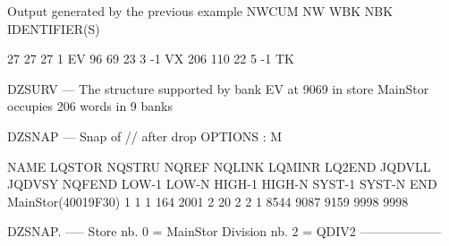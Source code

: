 \begin{landscapebody}
\begin{XMPt}{Output generated by the previous example}
  NWCUM     NW   WBK  NBK    IDENTIFIER(S)                                                                                       
                                                                                                                                 
     27     27    27    1     EV                                                                                                 
     96     69    23    3       -1 VX                                                                                            
    206    110    22    5            -1 TK                                                                                       
                                                                                                                                 
DZSURV --- The structure supported by bank EV   at       9069 in store MainStor occupies        206 words in      9 banks        
                                                                                                                                 
DZSNAP --- Snap of // after drop                                                                   OPTIONS : M                   
                                                                                                                                 
  NAME       LQSTOR NQSTRU  NQREF NQLINK LQMINR LQ2END JQDVLL JQDVSY NQFEND  LOW-1  LOW-N HIGH-1 HIGH-N SYST-1 SYST-N    END     
 MainStor(40019F30)      1      1      1    164   2001      2     20      2      2      1   8544   9087   9159   9998   9998     
                                                                                                                                 
DZSNAP.   -----  Store nb. 0 = MainStor Division nb. 2 = QDIV2                       --------------------                        
                                                                                                                                 

\end{XMPt}
\end{landscapebody}
